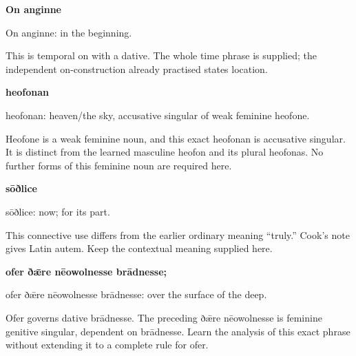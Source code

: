 \textbf{On anginne}

On anginne: in the beginning.

This is temporal on with a dative. The whole time phrase is supplied; the independent on-construction already practised states location.

\textbf{heofonan}

heofonan: heaven/\allowbreak{}the sky, accusative singular of weak feminine heofone.

Heofone is a weak feminine noun, and this exact heofonan is accusative singular. It is distinct from the learned masculine heofon and its plural heofonas. No further forms of this feminine noun are required here.

\textbf{sōðlice}

sōðlice: now; for its part.

This connective use differs from the earlier ordinary meaning “truly.” Cook’s note gives Latin autem. Keep the contextual meaning supplied here.

\textbf{ofer ðǣre nēowolnesse brādnesse;}

ofer ðǣre nēowolnesse brādnesse: over the surface of the deep.

Ofer governs dative brādnesse. The preceding ðǣre nēowolnesse is feminine genitive singular, dependent on brādnesse. Learn the analysis of this exact phrase without extending it to a complete rule for ofer.


